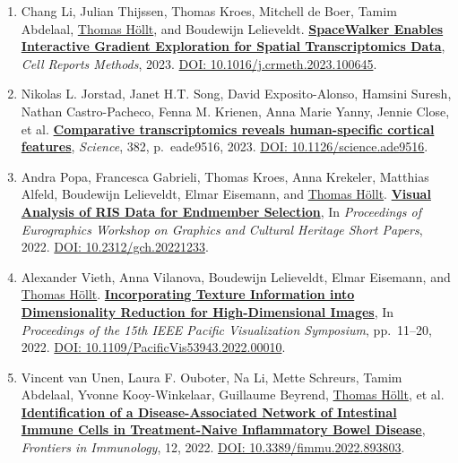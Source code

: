 \documentclass[10pt,a4paper,roman,final]{moderncv}
\newcommand*\highlightauthor[1]{\underline{#1}}
\begin{document}
\begin{enumerate}[leftmargin=0cm,start=2]
\item
Chang Li, Julian Thijssen, Thomas Kroes, Mitchell de Boer, Tamim Abdelaal, \highlightauthor{Thomas Höllt}, and Boudewijn Lelieveldt.
\href{https://www.thomashollt.com/publications/2023_spacewalker/}{\textbf{SpaceWalker Enables Interactive Gradient Exploration for Spatial Transcriptomics Data}},
\emph{Cell Reports Methods},
2023.
\href{https://doi.org/10.1016/j.crmeth.2023.100645}{DOI: 10.1016/\allowbreak j.crmeth.2023.100645}.


\item
Nikolas L. Jorstad, Janet H.T. Song, David Exposito-Alonso, Hamsini Suresh, Nathan Castro-Pacheco, Fenna M. Krienen, Anna Marie Yanny, Jennie Close, et al.
\href{https://www.thomashollt.com/publications/2022_great_apes/}{\textbf{Comparative transcriptomics reveals human-specific cortical features}},
\emph{Science}, 382, p.~eade9516,
2023.
\href{https://doi.org/10.1126/science.ade9516}{DOI: 10.1126/\allowbreak science.ade9516}.


\item
Andra Popa, Francesca Gabrieli, Thomas Kroes, Anna Krekeler, Matthias Alfeld, Boudewijn Lelieveldt, Elmar Eisemann, and \highlightauthor{Thomas Höllt}.
\href{https://www.thomashollt.com/publications/2022_gch_andra/}{\textbf{Visual Analysis of RIS Data for Endmember Selection}},
In \emph{Proceedings of Eurographics Workshop on Graphics and Cultural Heritage Short Papers},
2022.
\href{https://doi.org/10.2312/gch.20221233}{DOI: 10.2312/\allowbreak gch.20221233}.


\item
Alexander Vieth, Anna Vilanova, Boudewijn Lelieveldt, Elmar Eisemann, and \highlightauthor{Thomas Höllt}.
\href{https://www.thomashollt.com/publications/2022_spidr/}{\textbf{Incorporating Texture Information into Dimensionality Reduction for High-Dimensional Images}},
In \emph{Proceedings of the 15th IEEE Pacific Visualization Symposium}, pp.~11--20,
2022.
\href{https://doi.org/10.1109/PacificVis53943.2022.00010}{DOI: 10.1109/\allowbreak PacificVis53943.2022.00010}.


\item
Vincent van Unen, Laura F. Ouboter, Na Li, Mette Schreurs, Tamim Abdelaal, Yvonne Kooy-Winkelaar, Guillaume Beyrend, \highlightauthor{Thomas Höllt}, et al.
\href{https://www.thomashollt.com/publications/2022_front_immunol/}{\textbf{Identification of a Disease-Associated Network of Intestinal Immune Cells in Treatment-Naive Inflammatory Bowel Disease}},
\emph{Frontiers in Immunology}, 12,
2022.
\href{https://doi.org/10.3389/fimmu.2022.893803}{DOI: 10.3389/\allowbreak fimmu.2022.893803}.



\end{enumerate}
\end{document}
